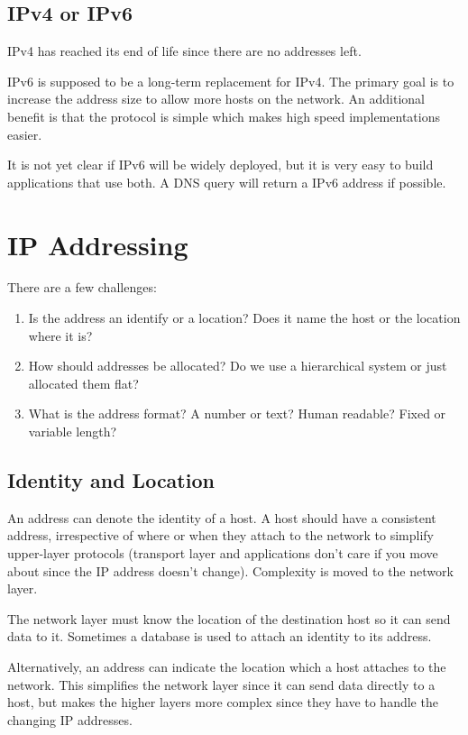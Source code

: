 \subsection{IPv4 or IPv6}\label{sub:ipv4_or_ipv6}

IPv4 has reached its end of life since there are no addresses left.

IPv6 is supposed to be a long-term replacement for IPv4.
The primary goal is to increase the address size to allow more hosts on the network.
An additional benefit is that the protocol is simple which makes high speed implementations easier.

It is not yet clear if IPv6 will be widely deployed, but it is very easy to build applications that use both.
A DNS query will return a IPv6 address if possible.

\section{IP Addressing}\label{sec:ip_addressing}

There are a few challenges:
\begin{enumerate}
	\item Is the address an identify or a location? Does it name the host or the location where it is?
	\item How should addresses be allocated? Do we use a hierarchical system or just allocated them flat?
	\item What is the address format? A number or text? Human readable? Fixed or variable length?
\end{enumerate}

\subsection{Identity and Location}\label{sub:identity_and_locaiton}

An address can denote the identity of a host.
A host should have a consistent address, irrespective of where or when they attach to the network to simplify upper-layer protocols (transport layer and applications don't care if you move about since the IP address doesn't change).
Complexity is moved to the network layer.

The network layer must know the location of the destination host so it can send data to it.
Sometimes a database is used to attach an identity to its address.

Alternatively, an address can indicate the location which a host attaches to the network.
This simplifies the network layer since it can send data directly to a host, but makes the higher layers more complex since they have to handle the changing IP addresses.

